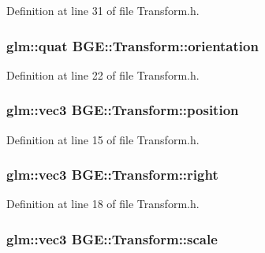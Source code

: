 Definition at line 31 of file Transform.\-h.

\hypertarget{class_b_g_e_1_1_transform_a34cb89e882e27db3bc4b42364f9209d7}{
\subsubsection[{orientation}]{\setlength{\rightskip}{0pt plus 5cm}glm\-::quat B\-G\-E\-::\-Transform\-::orientation}}\label{class_b_g_e_1_1_transform_a34cb89e882e27db3bc4b42364f9209d7}


Definition at line 22 of file Transform.\-h.

\hypertarget{class_b_g_e_1_1_transform_a6ed8b5c863f8194874bb7f67050ad733}{
\subsubsection[{position}]{\setlength{\rightskip}{0pt plus 5cm}glm\-::vec3 B\-G\-E\-::\-Transform\-::position}}\label{class_b_g_e_1_1_transform_a6ed8b5c863f8194874bb7f67050ad733}


Definition at line 15 of file Transform.\-h.

\hypertarget{class_b_g_e_1_1_transform_a33fed54241b66010041f63193b920dd0}{
\subsubsection[{right}]{\setlength{\rightskip}{0pt plus 5cm}glm\-::vec3 B\-G\-E\-::\-Transform\-::right}}\label{class_b_g_e_1_1_transform_a33fed54241b66010041f63193b920dd0}


Definition at line 18 of file Transform.\-h.

\hypertarget{class_b_g_e_1_1_transform_ad788c54156f11fcfcd00946b7617a4ae}{
\subsubsection[{scale}]{\setlength{\rightskip}{0pt plus 5cm}glm\-::vec3 B\-G\-E\-::\-Transform\-::scale}}\label{class_b_g_e_1_1_transform_ad788c54156f11fcfcd00946b7617a4ae}



